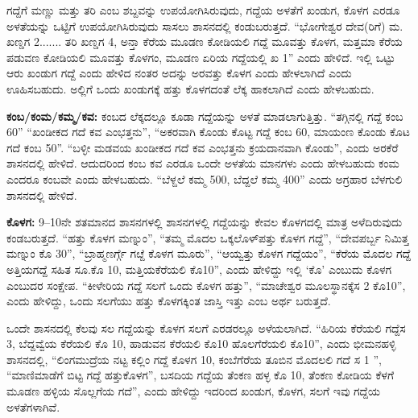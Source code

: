 \vskip 2pt

ಗದ್ದೆಗೆ ಮಣ್ಣು ಮತ್ತು ತರಿ ಎಂಬ ಶಬ್ದವನ್ನು ಉಪಯೋಗಿಸಿರುವುದು, ಗದ್ದೆಯ ಅಳತೆಗೆ ಖಂಡುಗ, ಕೊಳಗ ಎರಡೂ ಅಳತೆಯನ್ನು ಒಟ್ಟಿಗೆ ಉಪಯೋಗಿಸಿರುವುದು ಸಾಸಲು ಶಾಸನದಲ್ಲಿ ಕಂಡುಬರುತ್ತದೆ. “ಭೋಗೇಶ್ವರ ದೇವ(ರಿಗೆ) ಮ. ಖಣ್ಡಗ 2....... ತರಿ ಖಣ್ಡಗ 4, ಅನ್ತಾ ಕೆರೆಯ ಮೂಡಣ ಕೋಡಿಯಲಿ ಗದ್ದೆ ಮೂವತ್ತು ಕೊಳಗ, ಮತ್ತಮಾ ಕೆರೆಯ ಪಡುವಣ ಕೋಡಿಯಲಿ ಮೂವತ್ತು ಕೊಳಗಂ, ಮೂಡಣ ಏರಿಯ ಗದ್ದೆಯಲ್ಲಿ ಖ 1” ಎಂದು ಹೇಳಿದೆ. ಇಲ್ಲಿ ಒಟ್ಟು ಆರು ಖಂಡುಗ ಗದ್ದೆ ಎಂದು ಹೇಳಿದ ನಂತರ ಅದನ್ನು ಅರವತ್ತು ಕೊಳಗ ಎಂದು ಹೇಳಲಾಗಿದೆ ಎಂದು ಊಹಿಸಬಹುದು. ಅಲ್ಲಿಗೆ ಒಂದು ಖಂಡುಗಕ್ಕೆ ಹತ್ತು ಕೊಳಗದಂತೆ ಲೆಕ್ಕ ಹಾಕಲಾಗಿದೆ ಎಂದು ಹೇಳಬಹುದು.

\vskip 2pt

\textbf{ಕಂಬ/ಕಂಮ/ಕಮ್ಮ/ಕವ:} ಕಂಬದ ಲೆಕ್ಕದಲ್ಲೂ ಕೂಡಾ ಗದ್ದೆಯನ್ನು ಅಳತೆ ಮಾಡಲಾಗುತ್ತಿತ್ತು. “ತಗ್ಗಿನಲ್ಲಿ ಗದ್ದೆ ಕಂಬ 60” “ಖಂಡೀಕದ ಗದೆ ಕವ ಎಂಭತ್ತನು”, “ಅಕರವಾಗಿ ಕೊಂಡು ಕೊಟ್ಟ ಗದ್ದೆ ಕಂಬ 60, ಮಾಯಂಣ ಕೊಂಡು ಕೊಟ ಗದೆ ಕಂಬ 50”. “ಬಳ್ಳೀ ಮಡವಯ ಖಂಡೀಕದ ಗದೆ ಕವ ಎಂಭತ್ತನು ಕ್ರಯದಾನವಾಗಿ ಕೊಂಡು”, ಎಂದು ಅರಕೆರೆ ಶಾಸನದಲ್ಲಿ ಹೇಳಿದೆ. ಆದುದರಿಂದ ಕಂಬ ಕವ ಎರಡೂ ಒಂದೇ ಅಳತೆಯ ಮಾನಗಳು ಎಂದು ಹೇಳಬಹುದು ಕಂಮ ಎಂದರೂ ಕಂಬವೇ ಎಂದು ಹೇಳಬಹುದು. “ಬೆಳ್ದಲೆ ಕಮ್ಮ 500, ಬೆದ್ದಲೆ ಕಮ್ಮ 400” ಎಂದು ಅಗ್ರಹಾರ ಬೆಳಗುಲಿ ಶಾಸನದಲ್ಲಿ ಹೇಳಿದೆ.

\textbf{ಕೊಳಗ:} 9–10ನೇ ಶತಮಾನದ ಶಾಸನಗಳಲ್ಲಿ ಶಾಸನಗಳಲ್ಲಿ ಗದ್ದೆಯನ್ನು ಕೇವಲ ಕೊಳಗದಲ್ಲಿ ಮಾತ್ರ ಅಳೆದಿರುವುದು ಕಂಡಬರುತ್ತದೆ. “ಹತ್ತು ಕೊಳಗ ಮಣ್ನುಂ”, “ತಮ್ಮ ಮೊದಲ ಒಕ್ಕಲೊಳ್​ ಪತ್ತು ಕೊಳಗ ಗದ್ದೆ”, “ದೇವಪರ್ಬ್ಬ ನಿಮಿತ್ತ ಮಣ್ನುಂ ಕೊ 30”, “ಬ್ರಾಹ್ಮಣರ್ಗ್ಗೆ ಗೞ್ದೆ ಕೊಳಗ ಮೂರು”, “ಆಯ್ವತ್ತು ಕೊಳಗ ಗದ್ದೆಯಂ”, “ಕೆರೆಯ ಮೊದಲ ಗದ್ದೆ ಅತ್ತಿಯಗದ್ದೆ ಸಹಿತ ಸೂ.ಕೊ 10, ಮತ್ತಿಯಕೆರೆಯಲಿ ಕೊ10”, ಎಂದು ಹೇಳಿದ್ದು ಇಲ್ಲಿ ‘ಕೊ’ ಎಂಬುದು ಕೊಳಗ ಎಂಬುದರ ಸಂಕ್ಷೇಪ. “ಕೀಳೇರಿಯ ಗದ್ದೆ ಸಲಗೆ ಒಂದು ಕೊಳಗ ಹತ್ತು”, “ಮಾಚೇಶ್ವರ ಮೂಲಸ್ಥಾನಕ್ಕೆ\break ಸ 2 ಕೊ10”, ಎಂದು ಹೇಳಿದ್ದು, ಒಂದು ಸಲಗೆಯು ಹತ್ತು ಕೊಳಗಕ್ಕಿಂತ ಜಾಸ್ತಿ ಇತ್ತು ಎಂಬ ಅರ್ಥ ಬರುತ್ತದೆ.

ಒಂದೇ ಶಾಸನದಲ್ಲಿ ಕೆಲವು ಸಲ ಗದ್ದೆಯನ್ನು ಕೊಳಗ ಸಲಗೆ ಎರಡರಲ್ಲೂ ಅಳೆಯಲಾಗಿದೆ. “ಹಿರಿಯ ಕೆರೆಯಲಿ ಗದ್ದೆ\break ಸ 3, ಬೆದ್ದವ್ವೆಯ ಕೆರೆಯಲಿ ಕೊ 10, ಹಾಡುವನ ಕೆರೆಯಲಿ ಕೊ10 ಹೊಲಗೆರೆಯಲಿ ಕೊ10”, ಎಂದು ಭೀಮನಹಳ್ಳಿ ಶಾಸನದಲ್ಲಿ, “ಲಿಂಗಮುದ್ರೆಯ ನಟ್ಟ ಕಲ್ಲಿಂ ಗದ್ದೆ ಕೊಳಗ 10, ಕಂಬೆಗೆರೆಯ ತೂಬಿನ ಮೊದಲಲಿ ಗದೆ ಸ 1 ”, “ಮಾಣಿಮಾಡೆಗೆ ಬಿಟ್ಟ ಗದ್ದೆ ಹತ್ತುಕೊಳಗ”, ಬಸದಿಯ ಗದ್ದೆಯ ತೆಂಕಣ ಹಳ್ಳ ಕೊ 10, ತೆಂಕಣ ಕೋಡಿಯ ಕೆಳಗೆ ಮೂಡಣ ಹಳ್ಳಿಯ ಸೊಲ್ಲಗೆಯ ಗದೆ”, ಎಂದು ಹೇಳಿದ್ದು ಇದರಿಂದ ಖಂಡುಗ, ಕೊಳಗ, ಸಲಗೆ ಇವು ಗದ್ದೆಯ ಅಳತೆಗಳಾಗಿವೆ.


